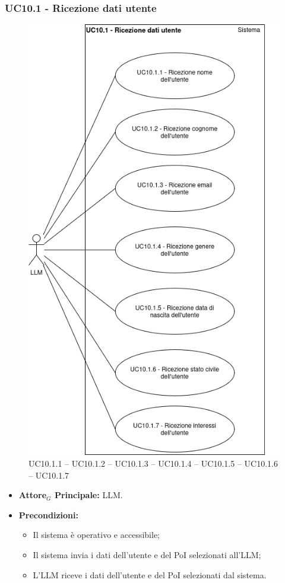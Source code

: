 \documentclass[11pt]{article}
\begin{document}
\begin{justify}
\subsubsection{\textbf{UC10.1 - Ricezione dati utente}}
\begin{figure}[H]
    \centering
    \includegraphics[width=0.7\linewidth]{UC10.1image.png}
    \caption{UC10.1.1 -- UC10.1.2 -- UC10.1.3 -- UC10.1.4 -- UC10.1.5 -- UC10.1.6 -- UC10.1.7}
    \label{fig:UC10.1}
\end{figure}
\label{UC10.1}
\begin{itemize}
    \item \textbf{Attore$_G$ Principale:} LLM.
    \item \textbf{Precondizioni:} 
        \begin{itemize}
          \item Il sistema è operativo e accessibile;
          \item Il sistema invia i dati dell'utente e del PoI selezionati all'LLM;
            \item L'LLM riceve i dati dell'utente e del PoI selezionati dal sistema.
        \end{itemize}

\end{itemize}
\end{justify}
\end{document}
